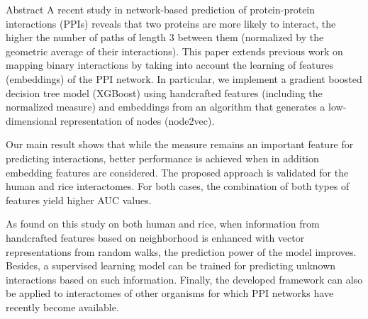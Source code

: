Abstract A recent study in network-based prediction of protein-protein interactions (PPIs) reveals that two proteins are more likely to interact, the higher the number of paths of length 3 between them (normalized by the geometric average of their interactions). This paper extends previous work on mapping binary interactions by taking into account the learning of features (embeddings) of the PPI network. In particular, we implement a gradient boosted decision tree model (XGBoost) using handcrafted features (including the normalized measure) and embeddings from an algorithm that generates a low-dimensional representation of nodes (node2vec).

Our main result shows that while the measure remains an important feature for predicting interactions, better performance is achieved when in addition embedding features are considered. The proposed approach is validated for the human and rice interactomes. For both cases, the combination of both types of features yield higher AUC values.

As found on this study on both human and rice, when information from handcrafted features based on neighborhood is enhanced with vector representations from random walks, the prediction power of the model improves. Besides, a supervised learning model can be trained for predicting unknown interactions based on such information. Finally, the developed framework can also be applied to interactomes of other organisms for which PPI networks have recently become available.